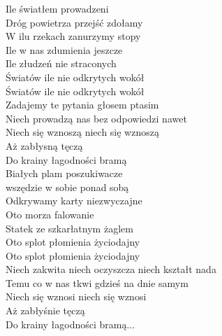 
Ile światłem prowadzeni \\
Dróg powietrza przejść zdołamy \\
W ilu rzekach zanurzymy stopy \\
\hops
Ile w nas zdumienia jeszcze \\
Ile złudzeń nie straconych \\
Światów ile nie odkrytych wokół \\
Światów ile nie odkrytych wokół \\
\hops
{} Zadajemy te pytania głosem ptasim \\
 Niech prowadzą nas bez odpowiedzi nawet \\
 Niech się wznoszą niech się wznoszą \\
 Aż zabłysną tęczą \\
 Do krainy łagodności bramą \\
\hops
Białych plam poszukiwacze \\
wszędzie w sobie ponad sobą \\
Odkrywamy karty niezwyczajne \\
\hops
Oto morza falowanie \\
Statek ze szkarłatnym żaglem \\
Oto splot płomienia życiodajny \\
Oto splot płomienia życiodajny \\
\hops
{} Niech zakwita niech oczyszcza niech kształt nada \\
 Temu co w nas tkwi gdzieś na dnie samym \\
 Niech się wznosi niech się wznosi \\
 Aż zabłyśnie tęczą \\
 Do krainy łagodności bramą...